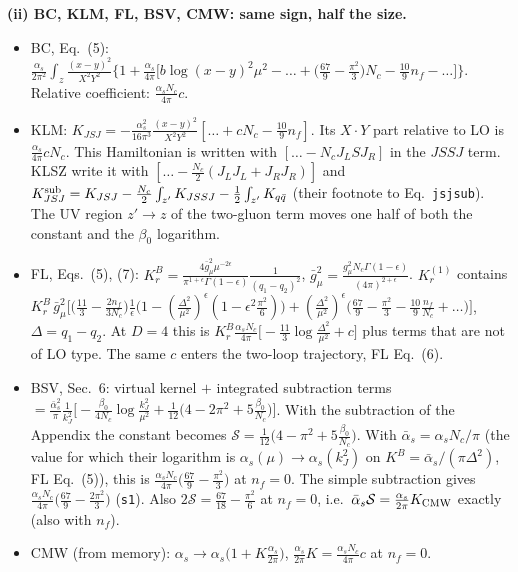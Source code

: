 \noindent\textbf{(ii) BC, KLM, FL, BSV, CMW: same sign, half the size.}
\begin{itemize}
\item BC, Eq.~(5): $\frac{\alpha_{s}}{2\pi^{2}}\int_{z}\frac{(x-y)^{2}}{X^{2}Y^{2}}\big\{1+\frac{\alpha_{s}}{4\pi}\big[b\log(x-y)^{2}\mu^{2}-\dots+\big(\frac{67}{9}-\frac{\pi^{2}}{3}\big)N_{c}-\frac{10}{9}n_{f}-\dots\big]\big\}$. Relative coefficient: $\frac{\alpha_{s}N_{c}}{4\pi}c$.
\item KLM: $K_{JSJ}=-\frac{\alpha_{s}^{2}}{16\pi^{3}}\frac{(x-y)^{2}}{X^{2}Y^{2}}[\dots+cN_{c}-\frac{10}{9}n_{f}]$. Its $X\cdot Y$ part relative to LO is $\frac{\alpha_{s}}{4\pi}cN_{c}$. This Hamiltonian is written with $[\dots-N_{c}J_{L}SJ_{R}]$ in the $JSSJ$ term. KLSZ write it with $[\dots-\frac{N_{c}}{2}(J_{L}J_{L}+J_{R}J_{R})]$ and $K_{JSJ}^{\rm sub}=K_{JSJ}-\frac{N_{c}}{2}\int_{z'}K_{JSSJ}-\frac12\int_{z'}K_{q\bar q}$ (their footnote to Eq.~\texttt{jsjsub}). The UV region $z'\to z$ of the two-gluon term moves one half of both the constant and the $\beta_{0}$ logarithm.
\item FL, Eqs.~(5), (7): $K_{r}^{B}=\frac{4\bar g^{2}_{\mu}\mu^{-2\epsilon}}{\pi^{1+\epsilon}\Gamma(1-\epsilon)}\frac{1}{(q_{1}-q_{2})^{2}}$, $\bar g^{2}_{\mu}=\frac{g^{2}_{\mu}N_{c}\Gamma(1-\epsilon)}{(4\pi)^{2+\epsilon}}$. $K_{r}^{(1)}$ contains $K_{r}^{B}\,\bar g^{2}_{\mu}\big[\big(\frac{11}{3}-\frac{2n_{f}}{3N_{c}}\big)\frac1\epsilon\big(1-(\frac{\Delta^{2}}{\mu^{2}})^{\epsilon}(1-\epsilon^{2}\frac{\pi^{2}}{6})\big)+(\frac{\Delta^{2}}{\mu^{2}})^{\epsilon}\big(\frac{67}{9}-\frac{\pi^{2}}{3}-\frac{10}{9}\frac{n_{f}}{N_{c}}+\dots\big)\big]$, $\Delta=q_{1}-q_{2}$. At $D=4$ this is $K_{r}^{B}\frac{\alpha_{s}N_{c}}{4\pi}\big[-\frac{11}{3}\log\frac{\Delta^{2}}{\mu^{2}}+c\big]$ plus terms that are not of LO type. The same $c$ enters the two-loop trajectory, FL Eq.~(6).
\item BSV, Sec.~6: virtual kernel $+$ integrated subtraction terms $=\frac{\bar\alpha^{2}_{s}}{\pi}\frac{1}{k_{J}^{2}}\big[-\frac{\beta_{0}}{4N_{c}}\log\frac{k_{J}^{2}}{\mu^{2}}+\frac{1}{12}\big(4-2\pi^{2}+5\frac{\beta_{0}}{N_{c}}\big)\big]$. With the subtraction of the Appendix the constant becomes $\mathcal S=\frac{1}{12}\big(4-\pi^{2}+5\frac{\beta_{0}}{N_{c}}\big)$. With $\bar\alpha_{s}=\alpha_{s}N_{c}/\pi$ (the value for which their logarithm is $\alpha_{s}(\mu)\to\alpha_{s}(k_{J}^{2})$ on $K^{B}=\bar\alpha_{s}/(\pi\Delta^{2})$, FL Eq.~(5)), this is $\frac{\alpha_{s}N_{c}}{4\pi}\big(\frac{67}{9}-\frac{\pi^{2}}{3}\big)$ at $n_{f}=0$. The simple subtraction gives $\frac{\alpha_{s}N_{c}}{4\pi}\big(\frac{67}{9}-\frac{2\pi^{2}}{3}\big)$ (\texttt{s1}). Also $2\mathcal S=\frac{67}{18}-\frac{\pi^{2}}{6}$ at $n_{f}=0$, i.e.\ $\bar\alpha_{s}\mathcal S=\frac{\alpha_{s}}{2\pi}K_{\rm CMW}$ exactly (also with $n_{f}$).
\item CMW (from memory): $\alpha_{s}\to\alpha_{s}\big(1+K\frac{\alpha_{s}}{2\pi}\big)$, $\frac{\alpha_{s}}{2\pi}K=\frac{\alpha_{s}N_{c}}{4\pi}c$ at $n_{f}=0$.
\end{itemize}
